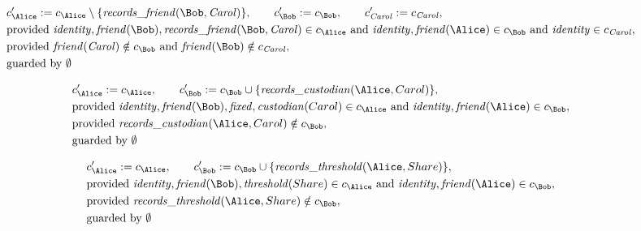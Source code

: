 \begin{align*}
&
c'_
{
\Alice
}
 := 
c_
{
\Alice
}
 \setminus 
\{
\mathit{\detokenize{
records_friend
}}
(
\Bob
,
\mathit{Carol}
)
\}
, \qquad 
c'_
{
\Bob
}
 := 
c_
{
\Bob
}
, \qquad 
c'_
{
\mathit{Carol}
}
 := 
c_
{
\mathit{Carol}
}
,\\
&
\text{provided } 
\mathit{\detokenize{
identity
}}
,
\mathit{\detokenize{
friend
}}
(
\Bob
)
,
\mathit{\detokenize{
records_friend
}}
(
\Bob
,
\mathit{Carol}
)
 \in c_
{
\Alice
}
 \text{ and } 
\mathit{\detokenize{
identity
}}
,
\mathit{\detokenize{
friend
}}
(
\Alice
)
 \in c_
{
\Bob
}
 \text{ and } 
\mathit{\detokenize{
identity
}}
 \in c_
{
\mathit{Carol}
}
,\\
&
\text{provided } 
\mathit{\detokenize{
friend
}}
(
\mathit{Carol}
)
 \notin c_
{
\Bob
}
 \text{ and } 
\mathit{\detokenize{
friend
}}
(
\Bob
)
 \notin c_
{
\mathit{Carol}
}
,\\
&
\text{guarded by } \emptyset
\end{align*}

\begin{align*}
&
c'_
{
\Alice
}
 := 
c_
{
\Alice
}
, \qquad 
c'_
{
\Bob
}
 := 
c_
{
\Bob
}
 \cup 
\{
\mathit{\detokenize{
records_custodian
}}
(
\Alice
,
Carol
)
\}
,\\
&
\text{provided } 
\mathit{\detokenize{
identity
}}
,
\mathit{\detokenize{
friend
}}
(
\Bob
)
,
\mathit{\detokenize{
fixed
}}
,
\mathit{\detokenize{
custodian
}}
(
Carol
)
 \in c_
{
\Alice
}
 \text{ and } 
\mathit{\detokenize{
identity
}}
,
\mathit{\detokenize{
friend
}}
(
\Alice
)
 \in c_
{
\Bob
}
,\\
&
\text{provided } 
\mathit{\detokenize{
records_custodian
}}
(
\Alice
,
Carol
)
 \notin c_
{
\Bob
}
,\\
&
\text{guarded by } \emptyset
\end{align*}

\begin{align*}
&
c'_
{
\Alice
}
 := 
c_
{
\Alice
}
, \qquad 
c'_
{
\Bob
}
 := 
c_
{
\Bob
}
 \cup 
\{
\mathit{\detokenize{
records_threshold
}}
(
\Alice
,
Share
)
\}
,\\
&
\text{provided } 
\mathit{\detokenize{
identity
}}
,
\mathit{\detokenize{
friend
}}
(
\Bob
)
,
\mathit{\detokenize{
threshold
}}
(
Share
)
 \in c_
{
\Alice
}
 \text{ and } 
\mathit{\detokenize{
identity
}}
,
\mathit{\detokenize{
friend
}}
(
\Alice
)
 \in c_
{
\Bob
}
,\\
&
\text{provided } 
\mathit{\detokenize{
records_threshold
}}
(
\Alice
,
Share
)
 \notin c_
{
\Bob
}
,\\
&
\text{guarded by } \emptyset
\end{align*}
